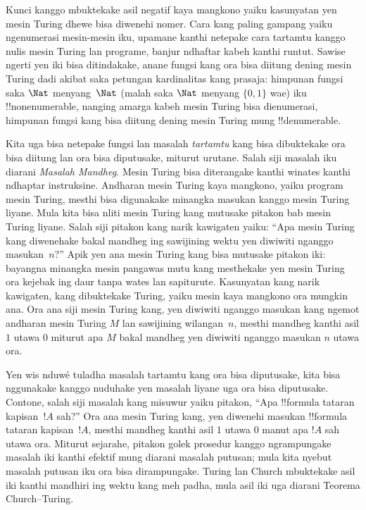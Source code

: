\documentclass[../../../include/open-logic-section]{subfiles}
\begin{document}
Kunci kanggo mbuktekake asil negatif kaya mangkono
yaiku kasunyatan yen mesin Turing dhewe bisa diwenehi
nomer. Cara kang paling gampang yaiku ngenumerasi
mesin-mesin iku, upamane kanthi netepake cara tartamtu
kanggo nulis mesin Turing lan programe, banjur
ndhaftar kabeh kanthi runtut. Sawise ngerti yen
iki bisa ditindakake, anane fungsi kang ora bisa
diitung dening mesin Turing dadi akibat saka
petungan kardinalitas kang prasaja: himpunan fungsi
saka $\Nat$ menyang~$\Nat$ (malah saka $\Nat$ menyang
$\{0, 1\}$ wae) iku !!{nonenumerable}, nanging
amarga kabeh mesin Turing bisa dienumerasi, himpunan
fungsi kang bisa diitung dening mesin Turing mung
!!{denumerable}.

Kita uga bisa netepake fungsi lan masalah
\emph{tartamtu} kang bisa dibuktekake ora bisa
diitung lan ora bisa diputusake, miturut urutane.
Salah siji masalah iku diarani \emph{Masalah Mandheg.}
Mesin Turing bisa diterangake kanthi winates
kanthi ndhaptar instruksine. Andharan mesin
Turing kaya mangkono, yaiku program mesin Turing,
mesthi bisa digunakake minangka masukan kanggo
mesin Turing liyane. Mula kita bisa nliti mesin
Turing kang mutusake pitakon bab mesin Turing liyane.
Salah siji pitakon kang narik kawigaten yaiku:
``Apa mesin Turing kang diwenehake bakal mandheg
ing sawijining wektu yen diwiwiti nganggo masukan~$n$?''
Apik yen ana mesin Turing kang bisa mutusake pitakon
iki: bayangna minangka mesin pangawas mutu kang
mesthekake yen mesin Turing ora kejebak ing daur
tanpa wates lan sapiturute. Kasunyatan kang narik
kawigaten, kang dibuktekake Turing, yaiku mesin kaya
mangkono ora mungkin ana. Ora ana siji mesin Turing
kang, yen diwiwiti nganggo masukan kang ngemot andharan
mesin Turing $M$ lan sawijining wilangan~$n$, mesthi
mandheg kanthi asil $1$ utawa $0$ miturut apa
$M$ bakal mandheg yen diwiwiti nganggo masukan $n$
utawa ora.

Yen wis nduwé tuladha masalah tartamtu kang ora bisa
diputusake, kita bisa nggunakake kanggo nuduhake
yen masalah liyane uga ora bisa diputusake. Contone,
salah siji masalah kang misuwur yaiku pitakon,
``Apa !!{formula} tataran kapisan~$!A$ sah?''
Ora ana mesin Turing kang, yen diwenehi masukan
!!{formula} tataran kapisan~$!A$, mesthi mandheg
kanthi asil $1$ utawa $0$ manut apa $!A$
sah utawa ora. Miturut sejarahe, pitakon golek
prosedur kanggo ngrampungake masalah iki kanthi
efektif mung diarani masalah putusan;
mula kita nyebut masalah putusan iku ora bisa
dirampungake. Turing lan Church mbuktekake asil
iki kanthi mandhiri ing wektu kang meh padha,
mula asil iki uga diarani Teorema Church--Turing.
\end{document}
